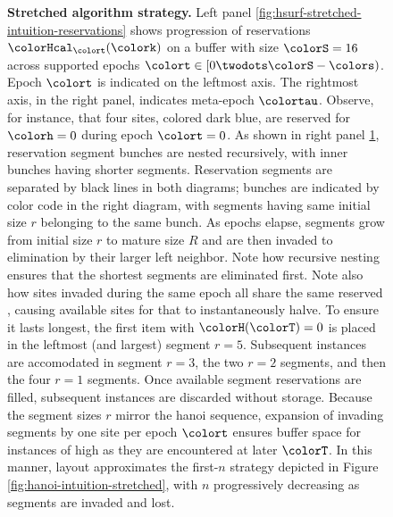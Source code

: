 \begin{figure}[htbp!]
\begin{subfigure}{0.5\textwidth}
\label{fig:hsurf-stretched-intuition-reservations-size}
\end{subfigure}
  \caption{
    \textbf{Stretched algorithm strategy.}
    \footnotesize
    Left panel \ref{fig:hsurf-stretched-intuition-reservations} shows progression of \hv{} reservations $\colorHcal_{\colort}(\colork)$ on a buffer with size $\colorS=16$ across supported epochs $\colort \in [0\twodots\colorS - \colors)$.
    Epoch $\colort$ is indicated on the leftmost axis.
    The rightmost axis, in the right panel, indicates meta-epoch $\colortau$.
    Observe, for instance, that four sites, colored dark blue, are reserved for \hv{} $\colorh=0$ during epoch $\colort=0$.
    As shown in right panel \ref{fig:hsurf-stretched-intuition-reservations-size}, reservation segment bunches are nested recursively, with inner bunches having shorter segments.
    Reservation segments are separated by black lines in both diagrams; bunches are indicated by color code in the right diagram, with segments having same initial size $r$ belonging to the same bunch.
    As epochs elapse, segments grow from initial size $r$ to mature size $R$ and are then invaded to elimination by their larger left neighbor.
    Note how recursive nesting ensures that the shortest segments are eliminated first.
    Note also how sites invaded during the same epoch all share the same reserved \hv{}, causing available sites for that \hv{} to instantaneously halve.
    To ensure it lasts longest, the first item with \hv{} $\colorH(\colorT) = 0$ is placed in the leftmost (and largest) segment $r=5$.
    Subsequent \hv{} instances are accomodated in segment $r=3$, the two $r=2$ segments, and then the four $r=1$ segments.
    Once available segment reservations are filled, subsequent \hv{} instances are discarded without storage.
    Because the segment sizes $r$ mirror the hanoi sequence, expansion of invading segments by one site per epoch $\colort$ ensures buffer space for instances of high \hv{} as they are encountered at later $\colorT$.
  In this manner, layout approximates the first-$n$ \hv{} strategy depicted in Figure \ref{fig:hanoi-intuition-stretched}, with $n$ progressively decreasing as segments are invaded and lost.
  }
  \label{fig:hsurf-stretched-intuition}
\end{figure}
